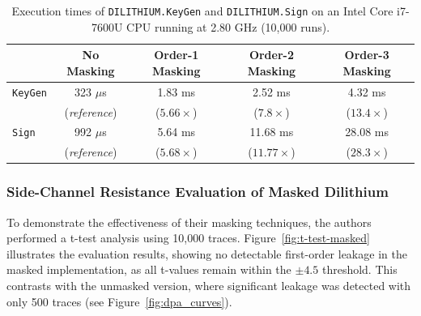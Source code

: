 \begin{table}[h]
    \centering
    \caption{Execution times of \texttt{DILITHIUM.KeyGen} and \texttt{DILITHIUM.Sign} on an Intel Core i7-7600U CPU running at 2.80 GHz (10,000 runs).}
    \label{tab:overall-performance}
    \begin{tabular}{|l|c|c|c|c|}
        \hline
                        & No Masking           & Order-1 Masking & Order-2 Masking & Order-3 Masking \\
        \hline
        \texttt{KeyGen} & 323 $\mu$s           & 1.83 ms         & 2.52 ms         & 4.32 ms         \\
                        & (\textit{reference}) & ($5.66\times$)  & ($7.8\times$)   & ($13.4\times$)  \\
        \hline
        \texttt{Sign}   & 992 $\mu$s           & 5.64 ms         & 11.68 ms        & 28.08 ms        \\
                        & (\textit{reference}) & ($5.68\times$)  & ($11.77\times$) & ($28.3\times$)  \\
        \hline
    \end{tabular}
\end{table}

\subsubsection{Side-Channel Resistance Evaluation of Masked Dilithium}

To demonstrate the effectiveness of their masking techniques, the authors performed a t-test analysis using 10,000 traces. Figure~\ref{fig:t-test-masked} illustrates the evaluation results, showing no detectable first-order leakage in the masked implementation, as all t-values remain within the $\pm4.5$ threshold. This contrasts with the unmasked version, where significant leakage was detected with only 500 traces (see Figure~\ref{fig:dpa_curves}).

